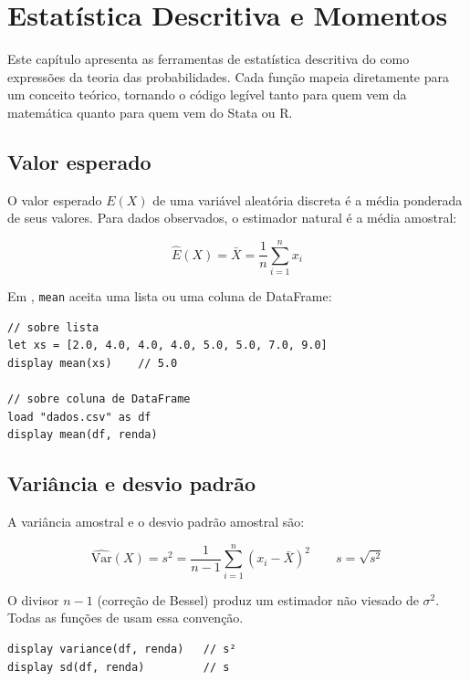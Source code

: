 \chapter{Estatística Descritiva e Momentos}
\label{cap:probabilidade}

Este capítulo apresenta as ferramentas de estatística descritiva do \hayashi{}
como expressões da teoria das probabilidades. Cada função mapeia diretamente
para um conceito teórico, tornando o código legível tanto para quem vem da
matemática quanto para quem vem do Stata ou R.

\section{Valor esperado}

O valor esperado $E(X)$ de uma variável aleatória discreta é a média ponderada
de seus valores. Para dados observados, o estimador natural é a média amostral:

\[
  \hat{E}(X) = \bar{X} = \frac{1}{n}\sum_{i=1}^{n} x_i
\]

Em \hayashi{}, \lstinline{mean} aceita uma lista ou uma coluna de DataFrame:

\begin{lstlisting}[caption={E(X) sobre lista e sobre coluna}]
// sobre lista
let xs = [2.0, 4.0, 4.0, 4.0, 5.0, 5.0, 7.0, 9.0]
display mean(xs)    // 5.0

// sobre coluna de DataFrame
load "dados.csv" as df
display mean(df, renda)
\end{lstlisting}

\section{Variância e desvio padrão}

A variância amostral e o desvio padrão amostral são:

\[
  \widehat{\mathrm{Var}}(X) = s^2 = \frac{1}{n-1}\sum_{i=1}^{n}(x_i - \bar{X})^2
  \qquad
  s = \sqrt{s^2}
\]

O divisor $n-1$ (correção de Bessel) produz um estimador não viesado de
$\sigma^2$. Todas as funções de \hayashi{} usam essa convenção.

\begin{lstlisting}[caption={Variância e desvio padrão}]
display variance(df, renda)   // s²
display sd(df, renda)         // s
\end{lstlisting}

